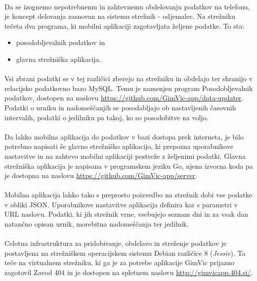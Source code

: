 \paragraph{}Da se izognemo nepotrebnemu in zahtevnemu obdelovanju podatkov na telefonu, je koncept delovanja zasnovan na sistemu strežnik - odjemalec. Na strežniku tečeta dva programa, ki mobilni aplikaciji zagotavljata željene podatke. To sta:
\begin{itemize}
  \setlength\itemsep{0em}
  \item posodobljevalnik podatkov in
  \item glavna strežniška aplikacija.
\end{itemize}

\paragraph{}Vsi zbrani podatki se v tej različici zberejo na strežniku in obdelajo ter shranijo v relacijsko podatkovno bazo MySQL\cite{mysql-wiki}. Temu je namenjen program Posodobljevalnik podatkov, dostopen na naslovu \url{https://github.com/GimVic-app/data-updater}. Podatki o urniku in nadomeščanjih se posodabljajo ob nastavljenih časovnih intervalih, podatki o jedilniku pa takoj, ko so posodobitve na voljo.

\paragraph{}Da lahko mobilna aplikacija  do podatkov v bazi dostopa prek interneta, je bilo potrebno napisati še glavno strežniško aplikacijo, ki prepozna uporabnikove nastavitve in na zahtevo mobilni aplikaciji postreže z željenimi podatki. Glavna strežniška aplikacija je napisana v programskem jeziku Go, njena izvorna koda pa je dostopna na naslovu \url{https://github.com/GimVic-app/server}.

\paragraph{}Mobilna aplikacija lahko tako s preprosto poizvedbo na strežnik dobi vse podatke v obliki JSON\cite{json-wiki}. Uporabnikove nastavitve aplikacija definira kar s parametri\cite{query-wiki} v URL naslovu. Podatki, ki jih strežnik vrne, vsebujejo seznam dni in za vsak dan natančno opisan urnik, morebitna nadomeščanja ter jedilnik.

\paragraph{}Celotna infrastruktura za pridobivanje, obdelavo in streženje podatkov je postavljena na strežniškem operacijskem sistemu Debian\cite{debian-wiki} različice 8 (\textit{Jessie}). Ta teče na virtualnem strežniku, ki ga je za potrebe aplikacije GimVic prijazno zagotovil Zavod 404 in je dostopen na spletnem naslovu \url{http://gimvicapp.404.si/}.

